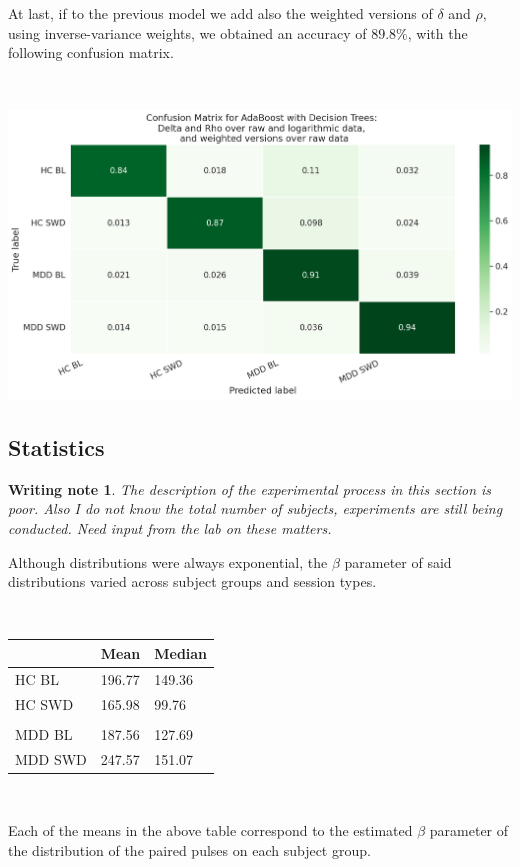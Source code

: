 \documentclass{article}
\newtheorem{wrnote}{Writing note}
\begin{document}
\justifying
\begin{multicols}{2}

At last, if to the previous model we add also the weighted versions of $\delta$
and $\rho$, using inverse-variance weights, we obtained an accuracy of $89.8\%$,
with the following confusion matrix.

\end{multicols}

\centering
~

\includegraphics[scale=0.4]{final-cm}


\justifying
\begin{multicols}{2}



\section{Statistics}

\begin{wrnote}
    The description of the experimental process in this section is poor. Also I
    do not know the total number of subjects, experiments are still being
    conducted. Need input from the lab on these matters.
\end{wrnote}


Although distributions were always exponential, the $\beta$ parameter of said
distributions varied across subject groups and session types. 

~

    \begin{tabular}{ |p{2cm}|p{2cm}|p{2cm}|  }
    \hline
    &       Mean & Median \\
    \hline
    HC BL & 196.77 & 149.36 \\
    \hline
    HC SWD & 165.98 & 99.76 \\
    \hline \\ 
    MDD BL & 187.56 & 127.69\\ 
    \hline 
    MDD SWD & 247.57 & 151.07 \\
    \hline
    \end{tabular}

~ 

Each of the means in the above table correspond to the estimated $\beta$
parameter of the distribution of the paired pulses on each subject group.

\end{multicols}
\raggedright
\end{document}

